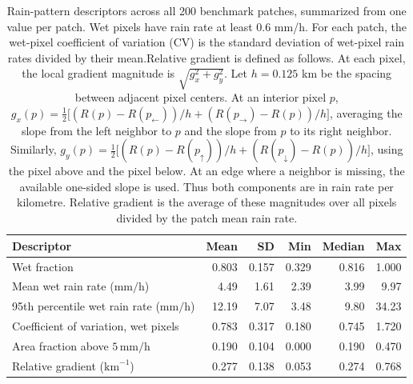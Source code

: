 \begin{table}[!htbp]\centering\small\begin{tabular}{lrrrrr}
\toprule Descriptor & Mean & SD & Min & Median & Max \\
\midrule
Wet fraction & 0.803 & 0.157 & 0.329 & 0.816 & 1.000 \\
Mean wet rain rate ($\mathrm{mm/h}$) & 4.49 & 1.61 & 2.39 & 3.99 & 9.97 \\
95th percentile wet rain rate ($\mathrm{mm/h}$) & 12.19 & 7.07 & 3.48 & 9.80 & 34.23 \\
Coefficient of variation, wet pixels & 0.783 & 0.317 & 0.180 & 0.745 & 1.720 \\
Area fraction above $5\,\mathrm{mm/h}$ & 0.190 & 0.104 & 0.000 & 0.190 & 0.470 \\
Relative gradient ($\mathrm{km}^{-1}$) & 0.277 & 0.138 & 0.053 & 0.274 & 0.768 \\
\bottomrule\end{tabular}
\caption{Rain-pattern descriptors across all 200 benchmark patches, summarized from one value per patch. Wet pixels have rain rate at least 0.6 mm/h. For each patch, the wet-pixel coefficient of variation (CV) is the standard deviation of wet-pixel rain rates divided by their mean.\newline Relative gradient is defined as follows. At each pixel, the local gradient magnitude is $\sqrt{g_x^2+g_y^2}$. Let $h=0.125$ km be the spacing between adjacent pixel centers. At an interior pixel $p$, $g_x(p)=\tfrac12\bigl[(R(p)-R(p_{\leftarrow}))/h+(R(p_{\rightarrow})-R(p))/h\bigr]$, averaging the slope from the left neighbor to $p$ and the slope from $p$ to its right neighbor. Similarly, $g_y(p)=\tfrac12\bigl[(R(p)-R(p_{\uparrow}))/h+(R(p_{\downarrow})-R(p))/h\bigr]$, using the pixel above and the pixel below. At an edge where a neighbor is missing, the available one-sided slope is used. Thus both components are in rain rate per kilometre. Relative gradient is the average of these magnitudes over all pixels divided by the patch mean rain rate.}
\label{tab:patch_rain_patterns}
\end{table}
